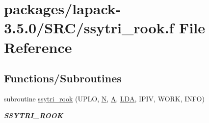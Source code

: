\hypertarget{ssytri__rook_8f}{}\section{packages/lapack-\/3.5.0/\+S\+R\+C/ssytri\+\_\+rook.f File Reference}
\label{ssytri__rook_8f}
\subsection*{Functions/\+Subroutines}
\begin{DoxyCompactItemize}
\item 
subroutine \hyperlink{group__realSYcomputational_ga34452db5ae0fdbcb107128a499a16e2c}{ssytri\+\_\+rook} (U\+P\+L\+O, \hyperlink{polmisc_8c_a0240ac851181b84ac374872dc5434ee4}{N}, \hyperlink{classA}{A}, \hyperlink{example__user_8c_ae946da542ce0db94dced19b2ecefd1aa}{L\+D\+A}, I\+P\+I\+V, W\+O\+R\+K, I\+N\+F\+O)
\begin{DoxyCompactList}\small\item\em {\bfseries S\+S\+Y\+T\+R\+I\+\_\+\+R\+O\+O\+K} \end{DoxyCompactList}\end{DoxyCompactItemize}
